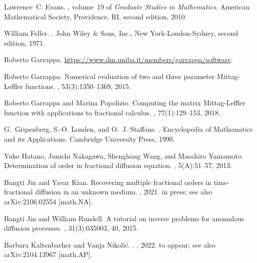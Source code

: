 \documentclass[12pt]{article}
\begin{document}
\begin{thebibliography}{10}
Lawrence~C. Evans.
, volume~19 of {\em Graduate
  Studies in Mathematics}.
\newblock American Mathematical Society, Providence, RI, second edition, 2010.

William Feller.
.
\newblock John Wiley \& Sons, Inc., New York-London-Sydney, second edition,
  1971.

Roberto Garrappa.
\newblock \url{https://www.dm.uniba.it/members/garrappa/software}.

Roberto Garrappa.
\newblock Numerical evaluation of two and three parameter {M}ittag-{L}effler
  functions.
, 53(3):1350--1369, 2015.

Roberto Garrappa and Marina Popolizio.
\newblock Computing the matrix {M}ittag-{L}effler function with applications to
  fractional calculus.
, 77(1):129--153, 2018.

G.~Gripenberg, S.-O. Londen, and O.~J. Staffans.
.
\newblock Encyclopedia of Mathematics and its Applications. Cambridge
  University Press, 1990.

Yuko Hatano, Junichi Nakagawa, Shenghang Wang, and Masahiro Yamamoto.
\newblock Determination of order in fractional diffusion equation.
, 5(A):51--57, 2013.

Bangti Jin and Yavar Kian.
\newblock Recovering multiple fractional orders in time-fractional diffusion in
  an unknown medium.
, 2021.
\newblock in press; see also arXiv:2106.02554 [math.NA].

Bangti Jin and William Rundell.
\newblock A tutorial on inverse problems for anomalous diffusion processes.
, 31(3):035003, 40, 2015.

Barbara Kaltenbacher and Vanja Nikoli\'c.
.
,
  2022.
\newblock to appear; see also arXiv:2104.13967 [math.AP].


\end{thebibliography}
\end{document}
